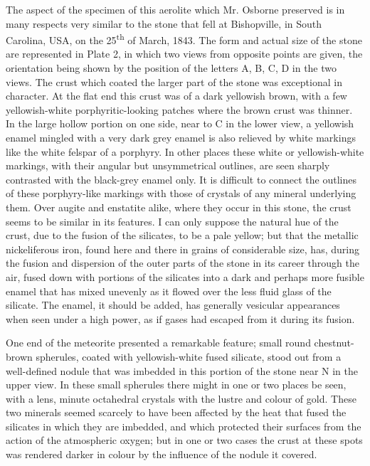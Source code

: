 \documentclass[a4paper, 12pt, oneside]{article}
\begin{document}
The aspect of the specimen of this aerolite which Mr. Osborne preserved is in many respects very similar to the stone that fell at Bishopville, in South Carolina, USA, on the 25\textsuperscript{th} of March, 1843. The form and actual size of the stone are represented in Plate 2, in which two views from opposite points are given, the orientation being shown by the position of the letters A, B, C, D in the two views. The crust which coated the larger part of the stone was exceptional in character. At the flat end this crust was of a dark yellowish brown, with a few yellowish-white porphyritic-looking patches where the brown crust was thinner. In the large hollow portion on one side, near to C in the lower view, a yellowish enamel mingled with a very dark grey enamel is also relieved by white markings like the white felspar of a porphyry. In other places these white or yellowish-white markings, with their angular but unsymmetrical outlines, are seen sharply contrasted with the black-grey enamel only. It is difficult to connect the outlines of these porphyry-like markings with those of crystals of any mineral underlying them. Over augite and enstatite alike, where they occur in this stone, the crust seems to be similar in its features. I can only suppose the natural hue of the crust, due to the fusion of the silicates, to be a pale yellow; but that the metallic nickeliferous iron, found here and there in grains of considerable size, has, during the fusion and dispersion of the outer parts of the stone in its career through the air, fused down with portions of the silicates into a dark and perhaps more fusible enamel that has mixed unevenly as it flowed over the less fluid glass of the silicate. The enamel, it should be added, has generally vesicular appearances when seen under a high power, as if gases had escaped from it during its fusion.

One end of the meteorite presented a remarkable feature; small round chestnut-brown spherules, coated with yellowish-white fused silicate, stood out from a well-defined nodule that was imbedded in this portion of the stone near N in the upper view. In these small spherules there might in one or two places be seen, with a lens, minute octahedral crystals with the lustre and colour of gold. These two minerals seemed scarcely to have been affected by the heat that fused the silicates in which they are imbedded, and which protected their surfaces from the action of the atmospheric oxygen; but in one or two cases the crust at these spots was rendered darker in colour by the influence of the nodule it covered.
\end{document}

